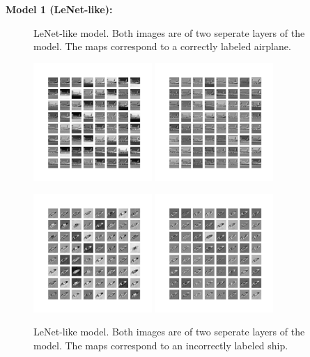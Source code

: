 \documentclass{article}[12pt]
\begin{document}
\begin{enumerate}[(a)]
    \textbf{Model 1 (LeNet-like):}
    \begin{figure}[H]
        \centering
            \caption{LeNet-like model. Both images are of two seperate layers of the model. The maps correspond to a correctly labeled airplane.}
            \includegraphics[width=0.4\textwidth]{layer1_correct_airplane1_oldmodel.png}
            \includegraphics[width=0.4\textwidth]{layer3_correct_airplane1_oldmodel.png}\\
            \caption{LeNet-like model. Both images are of two seperate layers of the model. The maps correspond to an incorrectly labeled ship.}
            \includegraphics[width=0.4\textwidth]{layer1_incorrect_ship8_oldmodel.png}
            \includegraphics[width=0.4\textwidth]{layer3_incorrect_ship8_oldmodel.png}
    \end{figure}


\end{enumerate}
\end{document}
